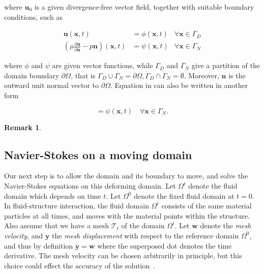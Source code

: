 \documentclass[11pt,a4paper,titlepage]{report}
\newtheorem*{remark}{Remark}
\newcommand{\mesh}{\mathcal{T}_t}
\begin{document}
where $\mathbf{u}_0$ is a given divergence-free vector field, together with suitable boundary conditions, such as

\begin{align}
\mathbf{u}(\mathbf{x},t) &= \phi (\mathbf{x}, t) & \forall \mathbf{x} \in \Gamma_D \\
\left( \mu \frac{\partial \mathbf{u}}{\partial \mathbf{n}} - p\mathbf{n} \right) (\mathbf{x},t) &= \psi(\mathbf{x},t) & \forall \mathbf{x} \in \Gamma_N
\end{align}


where $\phi$ and $\psi$ are given vector functions, while $\Gamma_D$ and $\Gamma_N$ give a partition of the domain boundary $\partial \Omega$, that is $\Gamma_D 	\cup \Gamma_N = \partial \Omega, \mathring{\Gamma}_D \cap \mathring{\Gamma}_N = \emptyset$. Moreover, $\mathbf{n}$ is the outward unit normal vector to $\partial \Omega$. Equation in can also be written in another form

\begin{equation}
[ \mu (\nabla \mathbf{u} + \nabla \mathbf{u}^T)  - p\mathbf{n} ] = \psi(\mathbf{x}, t)  \quad \forall \mathbf{x} \in \Gamma_N.
\end{equation}

\begin{remark}
\end{remark}


\subsection{Navier-Stokes on a moving domain}

Our next step is to allow the domain and its boundary to move, and
solve the Navier-Stokes equations on this deforming domain. Let
$\Omega^t$ denote the fluid domain which depends on time $t$. Let
$\Omega^0$ denote the fixed fluid domain at $t = 0$. In
fluid-structure interaction, the fluid domain $\Omega^t$ consists of
the same material particles at all times, and moves with the material
points within the structure. Also assume that we have a mesh $\mesh$
of the domain $\Omega^t$. Let $\mathbf{w}$ denote the \emph{mesh
  velocity}, and $\mathbf{y}$ the \emph{mesh displacement} with
respect to the reference domain $\Omega^0$, and thus by definition
$\dot{\mathbf{y}} = \mathbf{w}$ where the superposed dot denotes the
time derivative. The mesh velocity can be chosen arbitrarily in
principle, but this choice could effect the accuracy of the
solution~\cite{}.
\end{document}

